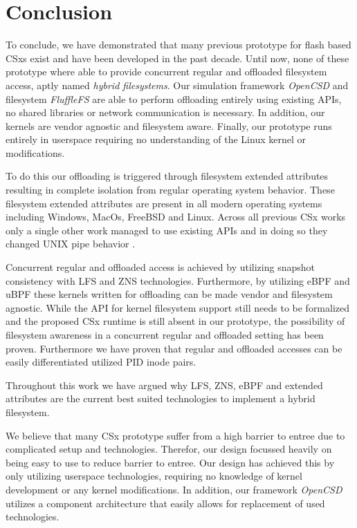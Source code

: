 \chapter{Conclusion}

To conclude, we have demonstrated that many previous prototype for flash based
CSxs exist and have been developed in the past decade. Until now, none of
these prototype where able to provide concurrent regular and offloaded
filesystem access, aptly named \textit{hybrid filesystems}. Our simulation
framework \textit{OpenCSD} and filesystem \textit{FluffleFS} are able to perform
offloading entirely using existing APIs, no shared libraries or network
communication is necessary. In addition, our kernels are vendor agnostic and
filesystem aware. Finally, our prototype runs entirely in userspace requiring no
understanding of the Linux kernel or modifications.

To do this our offloading is triggered through filesystem extended attributes
resulting in complete isolation from regular operating system behavior. These
filesystem extended attributes are present in all modern operating systems
including Windows, MacOs, FreeBSD and Linux. Across all previous CSx works only
a single other work managed to use existing APIs and in doing so they changed
UNIX pipe behavior \cite{10.1145/3342195.3387557}.

Concurrent regular and offloaded access is achieved by utilizing snapshot
consistency with LFS and ZNS technologies. Furthermore,
by utilizing eBPF and uBPF these kernels written for offloading can be made
vendor and filesystem agnostic. While the API for kernel filesystem support
still needs to be formalized and the proposed CSx runtime is still absent in our
prototype, the possibility of filesystem awareness in a concurrent regular and
offloaded setting has been proven. Furthermore we have proven that regular and
offloaded accesses can be easily differentiated utilized PID inode pairs.

Throughout this work we have argued why LFS, ZNS, eBPF and extended attributes
are the current best suited technologies to implement a hybrid filesystem.

We believe that many CSx prototype suffer from a high barrier to entree due to
complicated setup and technologies. Therefor, our design focussed heavily on
being easy to use to reduce barrier to entree. Our design has achieved this by
only utilizing userspace technologies, requiring no knowledge of kernel
development or any kernel modifications. In addition, our framework
\textit{OpenCSD} utilizes a component architecture that easily allows for
replacement of used technologies.

